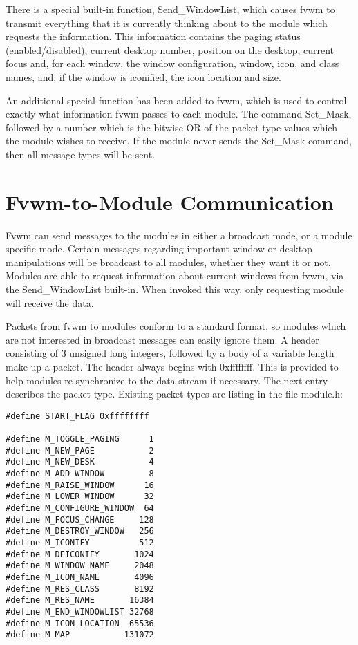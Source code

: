 There is a special built-in function, Send\_WindowList, which causes
fvwm to transmit everything that it is currently thinking about to
the module which requests the information. This information contains
the paging status (enabled/disabled), current desktop number, position
on the desktop, current focus and, for each window, the window
configuration, window, icon, and class names, and, if the window is
iconified, the icon location and size.

An additional special function has been added to fvwm, which is used
to control exactly what information fvwm passes to each module. The
command Set\_Mask, followed by a number which is the bitwise OR of the
packet-type values which the module wishes to receive. If the module
never sends the Set\_Mask command, then all message types will be
sent.

\section{Fvwm-to-Module Communication}
Fvwm
can send messages to the modules in either a broadcast mode, or a
module specific mode. Certain messages regarding important window or
desktop manipulations will be broadcast to all modules, whether they 
want it or not. Modules are able to request information about current windows
from fvwm, via the Send\_WindowList built-in. When invoked this way,
only requesting module will receive the data.

Packets from fvwm to modules conform to a standard format, so modules
which are not interested in broadcast messages can easily ignore them.
A header consisting of 3 unsigned long integers, followed by a body of
a variable length make up a packet. The header always begins with
0xffffffff. This is provided to help modules re-synchronize to the
data stream if necessary. The next entry describes the packet type.
Existing packet types are listing in the file module.h:
\begin{verbatim}
#define START_FLAG 0xffffffff

#define M_TOGGLE_PAGING      1
#define M_NEW_PAGE           2
#define M_NEW_DESK           4
#define M_ADD_WINDOW         8
#define M_RAISE_WINDOW      16
#define M_LOWER_WINDOW      32
#define M_CONFIGURE_WINDOW  64
#define M_FOCUS_CHANGE     128
#define M_DESTROY_WINDOW   256
#define M_ICONIFY          512
#define M_DEICONIFY       1024
#define M_WINDOW_NAME     2048
#define M_ICON_NAME       4096
#define M_RES_CLASS       8192
#define M_RES_NAME       16384
#define M_END_WINDOWLIST 32768
#define M_ICON_LOCATION  65536
#define M_MAP           131072
\end{verbatim}

